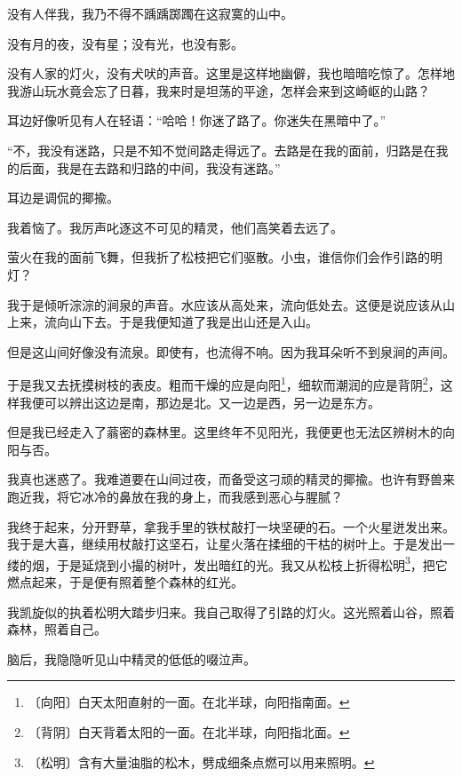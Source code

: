 \documentclass[12pt,UTF-8,openany]{ctexbook}
\begin{document}
\begin{normalsize}
    
    没有人伴我，我乃不得不踽踽踯躅在这寂寞的山中。
    
    没有月的夜，没有星；没有光，也没有影。
    
    没有人家的灯火，没有犬吠的声音。这里是这样地幽僻，我也暗暗吃惊了。怎样地我游山玩水竟会忘了日暮，我来时是坦荡的平途，怎样会来到这崎岖的山路？
    
    耳边好像听见有人在轻语：“哈哈！你迷了路了。你迷失在黑暗中了。”
    
    “不，我没有迷路，只是不知不觉间路走得远了。去路是在我的面前，归路是在我的后面，我是在去路和归路的中间，我没有迷路。”
    
    耳边是调侃的揶揄。
    
    我着恼了。我厉声叱逐这不可见的精灵，他们高笑着去远了。
    
    萤火在我的面前飞舞，但我折了松枝把它们驱散。小虫，谁信你们会作引路的明灯？
    
    我于是倾听淙淙的涧泉的声音。水应该从高处来，流向低处去。这便是说应该从山上来，流向山下去。于是我便知道了我是出山还是入山。
    
    但是这山间好像没有流泉。即使有，也流得不响。因为我耳朵听不到泉涧的声间。
    
    于是我又去抚摸树枝的表皮。粗而干燥的应是向阳\footnote{〔向阳〕白天太阳直射的一面。在北半球，向阳指南面。}，细软而潮润的应是背阴\footnote{〔背阴〕白天背着太阳的一面。在北半球，向阳指北面。}，这样我便可以辨出这边是南，那边是北。又一边是西，另一边是东方。
    
    但是我已经走入了蓊密的森林里。这里终年不见阳光，我便更也无法区辨树木的向阳与否。
    
    我真也迷惑了。我难道要在山间过夜，而备受这刁顽的精灵的揶揄。也许有野兽来跑近我，将它冰冷的鼻放在我的身上，而我感到恶心与腥腻？
    
    我终于起来，分开野草，拿我手里的铁杖敲打一块坚硬的石。一个火星迸发出来。我于是大喜，继续用杖敲打这坚石，让星火落在揉细的干枯的树叶上。于是发出一缕的烟，于是延烧到小撮的树叶，发出暗红的光。我又从松枝上折得松明\footnote{〔松明〕含有大量油脂的松木，劈成细条点燃可以用来照明。}，把它燃点起来，于是便有照着整个森林的红光。
    
    我凯旋似的执着松明大踏步归来。我自己取得了引路的灯火。这光照着山谷，照着森林，照着自己。
    
    脑后，我隐隐听见山中精灵的低低的啜泣声。
    
\end{normalsize}
\end{document}
